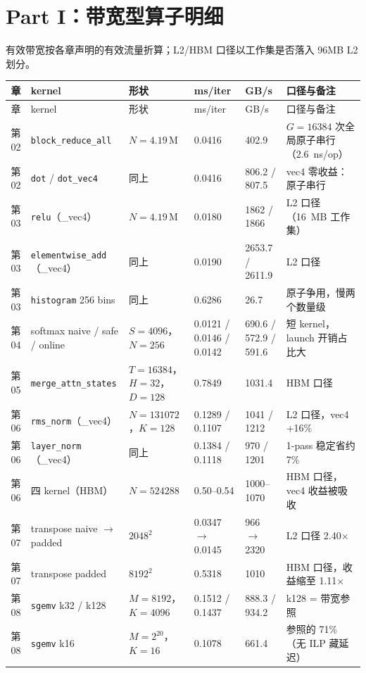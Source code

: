 \section{Part I：带宽型算子明细}

有效带宽按各章声明的有效流量折算；L2/HBM 口径以工作集是否落入 96MB L2 划分。

\begingroup\small
\begin{longtable}{cp{3.7cm}p{2.9cm}p{2.3cm}p{2.0cm}p{2.9cm}}
\toprule
章 & kernel & 形状 & ms/iter & GB/s & 口径与备注 \\
\midrule
\endfirsthead
\toprule
章 & kernel & 形状 & ms/iter & GB/s & 口径与备注 \\
\midrule
\endhead
\endfoot
\bottomrule
\endlastfoot
第02 & \texttt{block\_\allowbreak{}reduce\_\allowbreak{}all} & $N{=}4.19\,$M & 0.0416 & 402.9 & $G{=}16384$ 次全局原子串行（2.6~ns/op） \\
第02 & \texttt{dot} / \texttt{dot\_vec4} & 同上 & 0.0416 & 806.2 / 807.5 & vec4 零收益：原子串行 \\
第03 & \texttt{relu}（\_vec4） & $N{=}4.19\,$M & 0.0180 & 1862 / 1866 & L2 口径（16~MB 工作集） \\
第03 & \texttt{elementwise\_\allowbreak{}add}（\_vec4） & 同上 & 0.0190 & 2653.7 / 2611.9 & L2 口径 \\
第03 & \texttt{histogram} 256 bins & 同上 & 0.6286 & 26.7 & 原子争用，慢两个数量级 \\
第04 & softmax naive / safe / online & $S{=}4096$，$N{=}256$ & 0.0121 / 0.0146 / 0.0142 & 690.6 / 572.9 / 591.6 & 短 kernel，launch 开销占比大 \\
第05 & \texttt{merge\_\allowbreak{}attn\_\allowbreak{}states} & $T{=}16384$，$H{=}32$，$D{=}128$ & 0.7849 & 1031.4 & HBM 口径 \\
第06 & \texttt{rms\_norm}（\_vec4） & $N{=}131072$，$K{=}128$ & 0.1289 / 0.1107 & 1041 / 1212 & L2 口径，vec4 +16\% \\
第06 & \texttt{layer\_norm}（\_vec4） & 同上 & 0.1384 / 0.1118 & 970 / 1201 & 1-pass 稳定省约 7\% \\
第06 & 四 kernel（HBM） & $N{=}524288$ & 0.50--0.54 & 1000--1070 & HBM 口径，vec4 收益被吸收 \\
第07 & transpose naive $\to$ padded & $2048^2$ & 0.0347 $\to$ 0.0145 & 966 $\to$ 2320 & L2 口径 2.40$\times$ \\
第07 & transpose padded & $8192^2$ & 0.5318 & 1010 & HBM 口径，收益缩至 1.11$\times$ \\
第08 & \texttt{sgemv} k32 / k128 & $M{=}8192$，$K{=}4096$ & 0.1512 / 0.1437 & 888.3 / 934.2 & k128 = 带宽参照 \\
第08 & \texttt{sgemv} k16 & $M{=}2^{20}$，$K{=}16$ & 0.1078 & 661.4 & 参照的 71\%（无 ILP 藏延迟） \\
\end{longtable}
\endgroup


